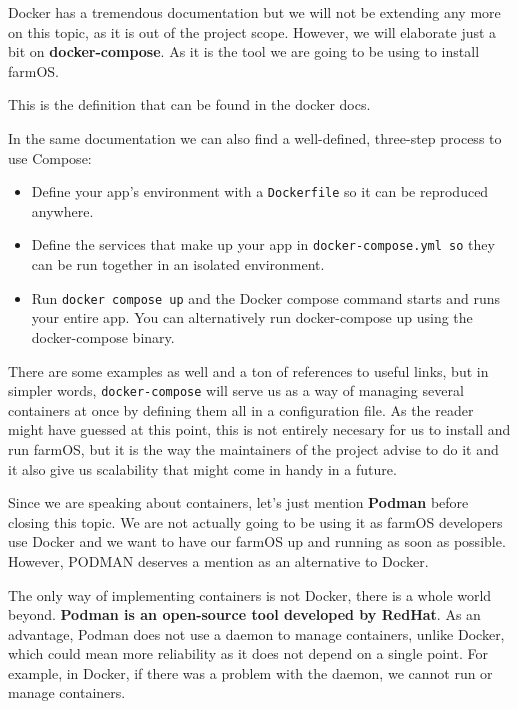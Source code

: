 \vspace{7mm}
Docker has a tremendous documentation but we will not be extending any more on this topic, as it is out of the project scope. However, we will elaborate just a bit on \textbf{docker-compose}\cite{docker-compose}. As it is the tool we are going to be using to install farmOS.

This is the definition that can be found in the docker docs.


\vspace{5mm}
In the same documentation we can also find a well-defined, three-step process to use Compose:
\begin{itemize}
	\item Define your app’s environment with a \verb|Dockerfile|\cite{dockerfile} so it can be reproduced anywhere.
	\item Define the services that make up your app in \verb|docker-compose.yml so| they can be run together in an isolated environment.
	\item Run \verb|docker compose up| and the Docker compose command starts and runs your entire app. You can alternatively run docker-compose up using the docker-compose binary.
\end{itemize}

\vspace{7mm}
There are some examples as well and a ton of references to useful links, but in simpler words, \verb|docker-compose| will serve us as a way of managing several containers at once by defining them all in a configuration file. As the reader might have guessed at this point, this is not entirely necesary for us to install and run farmOS, but it is the way the maintainers of the project advise to do it and it also give us scalability that might come in handy in a future.

\vspace{7mm}
Since we are speaking about containers, let's just mention \textbf{Podman}\cite{podman} before closing this topic. We are not actually going to be using it as farmOS developers use Docker and we want to have our farmOS up and running as soon as possible. However, PODMAN deserves a mention as an alternative to Docker.

\vspace{7mm}
The only way of implementing containers is not Docker, there is a whole world beyond. \textbf{Podman is an open-source tool developed by RedHat}. As an advantage, Podman does not use a daemon to manage containers, unlike Docker, which could mean more reliability as it does not depend on a single point. For example, in Docker, if there was a problem with the daemon, we cannot run or manage containers.

